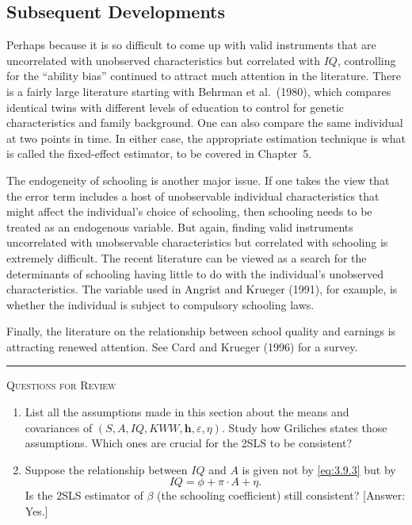 \subsection*{Subsequent Developments}

Perhaps because it is so difficult to come up with valid instruments that are uncorrelated
with unobserved characteristics but correlated with $IQ$, controlling for the
``ability bias'' continued to attract much attention in the literature.  There is a fairly
large literature starting with Behrman et al.\ (1980), which compares identical twins
with different levels of education to control for genetic characteristics and family
background.  One can also compare the same individual at two points in time.  In
either case, the appropriate estimation technique is what is called the fixed-effect
estimator, to be covered in Chapter~5.

The endogeneity of schooling is another major issue.  If one takes the view that
the error term includes a host of unobservable individual characteristics that might
affect the individual's choice of schooling, then schooling needs to be treated as an
endogenous variable.  But again, finding valid instruments uncorrelated with unobservable
characteristics but correlated with schooling is extremely difficult.  The
recent literature can be viewed as a search for the determinants of schooling having
little to do with the individual's unobserved characteristics.  The variable used
in Angrist and Krueger (1991), for example, is whether the individual is subject to
compulsory schooling laws.

Finally, the literature on the relationship between school quality and earnings
is attracting renewed attention.  See Card and Krueger (1996) for a survey.

\bigskip
\begin{center}\rule{0.6\textwidth}{0.4pt}\end{center}
\noindent\textsc{Questions for Review}
\medskip

\begin{enumerate}
\item List all the assumptions made in this section about the means and covariances
  of $(S, A, IQ, KWW, \mathbf{h}, \varepsilon, \eta)$.  Study how Griliches states those assumptions.
  Which ones are crucial for the 2SLS to be consistent?

\item Suppose the relationship between $IQ$ and $A$ is given not by \eqref{eq:3.9.3} but by
  \[
    IQ = \phi + \pi \cdot A + \eta.
  \]
  Is the 2SLS estimator of $\beta$ (the schooling coefficient) still consistent?
  [Answer: Yes.]
\end{enumerate}
